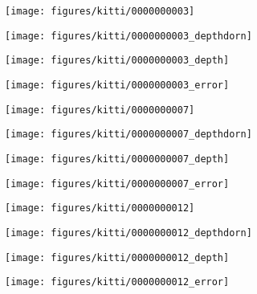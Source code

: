 \documentclass[10pt,twocolumn,letterpaper]{article}
\begin{document}
\begin{figure*}[t]
\centering
\begin{subfigure}{0.49\columnwidth}
  \centering
  \texttt{[image: figures/kitti/0000000003]}
\end{subfigure}
\begin{subfigure}{0.49\columnwidth}
  \centering
  \texttt{[image: figures/kitti/0000000003\_depthdorn]}
\end{subfigure}
\begin{subfigure}{0.49\columnwidth}
  \centering
  \texttt{[image: figures/kitti/0000000003\_depth]}
\end{subfigure}
\begin{subfigure}{0.49\columnwidth}
  \centering
  \texttt{[image: figures/kitti/0000000003\_error]}
\end{subfigure}

\begin{subfigure}{0.49\columnwidth}
  \centering
  \texttt{[image: figures/kitti/0000000007]}
\end{subfigure}
\begin{subfigure}{0.49\columnwidth}
  \centering
  \texttt{[image: figures/kitti/0000000007\_depthdorn]}
\end{subfigure}
\begin{subfigure}{0.49\columnwidth}
  \centering
  \texttt{[image: figures/kitti/0000000007\_depth]}
\end{subfigure}
\begin{subfigure}{0.49\columnwidth}
  \centering
  \texttt{[image: figures/kitti/0000000007\_error]}
\end{subfigure}

\begin{subfigure}{0.49\columnwidth}
  \centering
  \texttt{[image: figures/kitti/0000000012]}
\end{subfigure}
\begin{subfigure}{0.49\columnwidth}
  \centering
  \texttt{[image: figures/kitti/0000000012\_depthdorn]}
\end{subfigure}
\begin{subfigure}{0.49\columnwidth}
  \centering
  \texttt{[image: figures/kitti/0000000012\_depth]}
\end{subfigure}
\begin{subfigure}{0.49\columnwidth}
  \centering
  \texttt{[image: figures/kitti/0000000012\_error]}
\end{subfigure}


\end{figure*}
\end{document}
